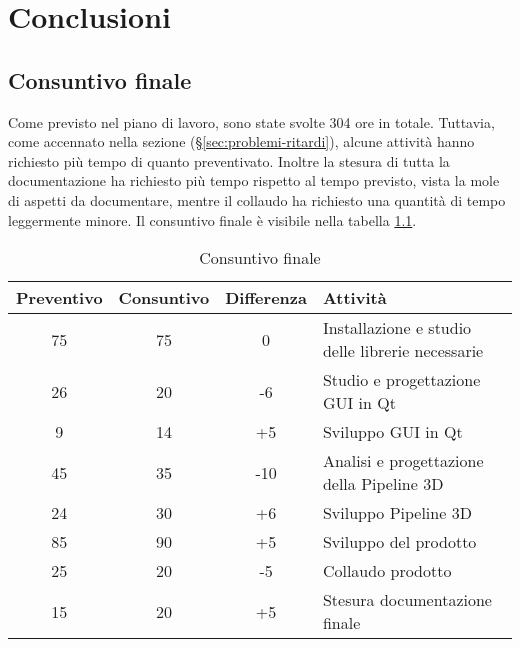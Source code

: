 
\chapter{Conclusioni}
\label{cap:conclusioni}

\section{Consuntivo finale}
Come previsto nel piano di lavoro, sono state svolte 304 ore in totale. Tuttavia, come accennato nella sezione  (§\ref{sec:problemi-ritardi}), alcune attività hanno richiesto più tempo di quanto preventivato. Inoltre la stesura di tutta la documentazione ha richiesto più tempo rispetto al tempo previsto, vista la mole di aspetti da documentare, mentre il collaudo ha richiesto una quantità di tempo leggermente minore. Il consuntivo finale è visibile nella tabella \ref{table:consuntivo-finale}.

\begin{center}
    \begin{table}[h]
    \def\arraystretch{1.5}
    \setlength\extrarowheight{5pt}
    \begin{tabular}{| c | c | c | p{5cm} |}
        \hline
        \textbf{Preventivo} & \textbf{Consuntivo} & \textbf{Differenza} & \textbf{Attività} \\ \hline  
        75 & 75 & 0 & Installazione e studio delle librerie necessarie\\ \hline
        26 & 20 & -6 & Studio e progettazione GUI in Qt\\ \hline
        9 & 14 & +5 & Sviluppo GUI in Qt\\ \hline
        45 & 35 & -10 & Analisi e progettazione della Pipeline 3D\\ \hline
        24 & 30 & +6 & Sviluppo Pipeline 3D\\ \hline
        85 & 90 & +5 & Sviluppo del prodotto\\ \hline
        25 & 20 & -5 & Collaudo prodotto\\ \hline
        15 & 20 & +5 & Stesura documentazione finale\\ \hline
    \end{tabular}
    \caption{Consuntivo finale}
    \label{table:consuntivo-finale}
    \end{table}
\end{center}

